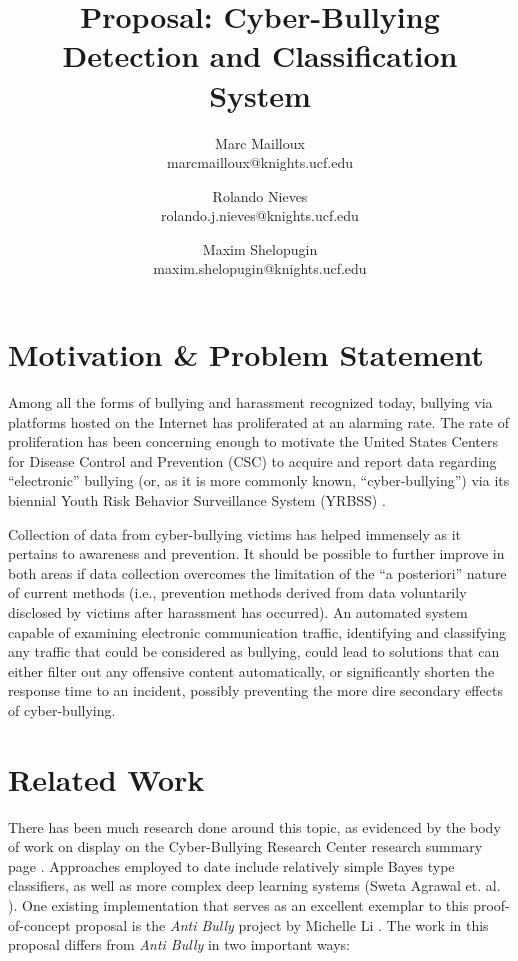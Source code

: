 \documentclass[conference]{sig-alternate-05-2015}
\begin{document}
\title{Proposal: Cyber-Bullying Detection and Classification System}



\author{Marc Mailloux\\ marcmailloux@knights.ucf.edu \and Rolando Nieves  \\ rolando.j.nieves@knights.ucf.edu \and Maxim Shelopugin\\ maxim.shelopugin@knights.ucf.edu}

\maketitle


\section{Motivation \& Problem Statement}\label{sec:motivation}
Among all the forms of bullying and harassment recognized today, bullying via
platforms hosted on the Internet has proliferated at an alarming rate. The rate
of proliferation has been concerning enough to motivate the United States
Centers for Disease Control and Prevention (CSC) to acquire and report data regarding
\enquote{electronic} bullying (or, as it is more commonly known, \enquote{cyber-bullying}) via its
biennial Youth Risk Behavior Surveillance System (YRBSS) \cite{CBRC_facts2018}.

Collection of data from cyber-bullying victims has helped immensely as it pertains
to awareness and prevention. It should be possible to further improve in both areas if
data collection overcomes the limitation of the \enquote{a posteriori} nature of current
methods (i.e., prevention methods derived from data voluntarily disclosed by
victims after harassment has occurred). An automated system capable of examining
electronic communication traffic, identifying and classifying any traffic that
could be considered as bullying, could lead to solutions that can either filter
out any offensive content automatically, or significantly shorten the response
time to an incident, possibly preventing the more dire secondary effects of
cyber-bullying.


\section{Related Work}\label{sec:related}

There has been much research done around this topic, as evidenced by the body of
work on display on the Cyber-Bullying Research Center research summary page
\cite{CBRC_research2018}. Approaches employed to date include relatively
simple Bayes type classifiers, as well as more complex deep learning systems
(Sweta Agrawal et. al. \cite{agrawal2018deep}). One existing implementation that
serves as an excellent exemplar to this proof-of-concept proposal is the
\textit{Anti Bully} project by Michelle Li \cite{Li2016}. The work in this
proposal differs from \textit{Anti Bully} in two important ways:
\end{document}
